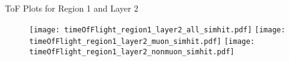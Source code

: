 \documentclass[11pt,a4paper]{beamer}
\begin{document}
\begin{frame}{ToF Plots for Region 1 and Layer 2}
\begin{figure}[htbp]
\hfill
\texttt{[image: timeOfFlight\_region1\_layer2\_all\_simhit.pdf]} 
\hfill
\texttt{[image: timeOfFlight\_region1\_layer2\_muon\_simhit.pdf]}
\hfill
\texttt{[image: timeOfFlight\_region1\_layer2\_nonmuon\_simhit.pdf]} 
\hfill
\end{figure}
\end{frame}
\end{document}
